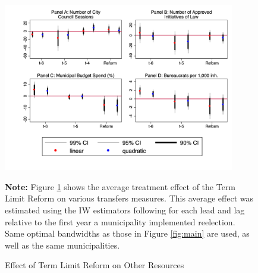 \documentclass[12pt]{amsart}
\numberwithin{equation}{section}
\theoremstyle{definition}
\theoremstyle{definition}
\theoremstyle{definition}
\begin{document}
 \begin{figure}[h]   
\centering
 \caption{Effect of Term Limit Reform on Other Resources}
 \label{fig:effort}
\includegraphics[width=0.9\textwidth]{../Figures_incumbency/effort_based_incumbency.png}
       \captionsetup{justification=centering}
         
 \textbf{Note:} Figure \ref{fig:effort} shows the average treatment effect of the Term Limit Reform on various transfers measures. This average effect was estimated using the IW estimators following \citet{abraham_sun_2020} for each lead and lag relative to the first year a municipality implemented reelection. Same optimal bandwidths as those in Figure \ref{fig:main} are used, as well as the same municipalities.   
\end{figure}   
\end{document}
